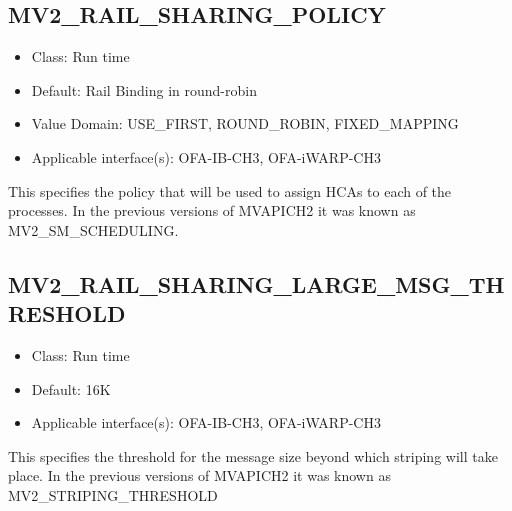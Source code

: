 \subsection{MV2\_RAIL\_SHARING\_POLICY}
\label{def:rail-sharing-policy}
\begin{itemize}
    \item Class: Run time
    \item Default: Rail Binding in round-robin
    \item Value Domain: USE\_FIRST, ROUND\_ROBIN, FIXED\_MAPPING
    \item Applicable interface(s): OFA-IB-CH3, OFA-iWARP-CH3
\end{itemize}
This specifies the policy that will be used to assign HCAs to each of the processes. In the 
previous versions of MVAPICH2 it was known as MV2\_SM\_SCHEDULING.

\subsection{MV2\_RAIL\_SHARING\_LARGE\_MSG\_THRESHOLD}
\label{def:rail-sharing-large-msg-threshold}
\begin{itemize}
    \item Class: Run time
    \item Default: 16K
    \item Applicable interface(s): OFA-IB-CH3, OFA-iWARP-CH3
\end{itemize}
This specifies the threshold for the message size beyond which striping will take place. 
In the previous versions of MVAPICH2 it was known as MV2\_STRIPING\_THRESHOLD


